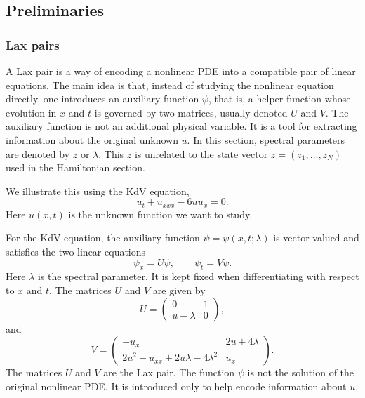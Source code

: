 \documentclass[english,master]{liumaiex}
\theoremstyle{thesisplain}
\theoremstyle{thesisdefinition}
\numberwithin{equation}{section}
\begin{document}
\subsection{Preliminaries}
\subsubsection*{Lax pairs}

A Lax pair is a way of encoding a nonlinear PDE into a compatible pair of linear equations. The main idea is that, instead of studying the nonlinear equation directly, one introduces an auxiliary function $\psi$, that is, a helper function whose evolution in $x$ and $t$ is governed by two matrices, usually denoted $U$ and $V$. The auxiliary function is not an additional physical variable. It is a tool for extracting information about the original unknown $u$. In this section, spectral parameters are denoted by $z$ or $\lambda$. This $z$ is unrelated to the state vector $z=(z_1,\dots,z_N)$ used in the Hamiltonian section.

We illustrate this using the KdV equation,
\begin{equation}
	u_t + u_{xxx} - 6uu_x = 0.
\end{equation}
Here $u(x,t)$ is the unknown function we want to study.

For the KdV equation, the auxiliary function $\psi=\psi(x,t;\lambda)$ is vector-valued and satisfies the two linear equations
\begin{equation}
	\psi_x = U\psi,
	\qquad
	\psi_t = V\psi.
\end{equation}
Here $\lambda$ is the spectral parameter. It is kept fixed when differentiating with respect to $x$ and $t$. The matrices $U$ and $V$ are given by
\begin{equation}
	U =
	\begin{pmatrix}
		0 & 1 \\
		u - \lambda & 0
	\end{pmatrix},
\end{equation}
and
\begin{equation}
	V =
	\begin{pmatrix}
		-u_x & 2u + 4\lambda \\
		2u^2 - u_{xx} + 2u\lambda - 4\lambda^2 & u_x
	\end{pmatrix}.
\end{equation}
The matrices $U$ and $V$ are the Lax pair. The function $\psi$ is not the solution of the original nonlinear PDE. It is introduced only to help encode information about $u$.
\end{document}
